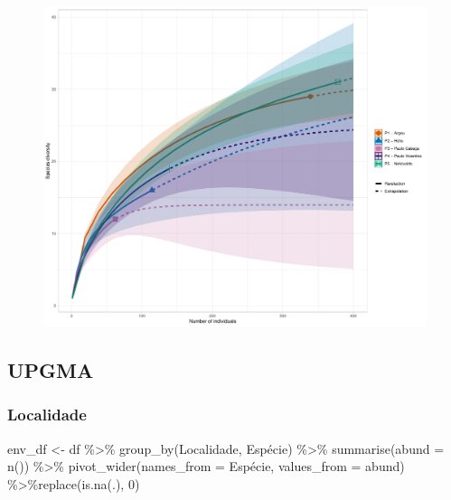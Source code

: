 \documentclass[
  letterpaper,
  DIV=11,
  numbers=noendperiod]{scrartcl}
\newenvironment{Shaded}{\begin{snugshade}}{\end{snugshade}}
\newcommand{\AttributeTok}[1]{\textcolor[rgb]{0.40,0.45,0.13}{#1}}
\newcommand{\DecValTok}[1]{\textcolor[rgb]{0.68,0.00,0.00}{#1}}
\newcommand{\FunctionTok}[1]{\textcolor[rgb]{0.28,0.35,0.67}{#1}}
\newcommand{\NormalTok}[1]{\textcolor[rgb]{0.00,0.23,0.31}{#1}}
\newcommand{\OtherTok}[1]{\textcolor[rgb]{0.00,0.23,0.31}{#1}}
\newcommand{\SpecialCharTok}[1]{\textcolor[rgb]{0.37,0.37,0.37}{#1}}
\begin{document}
\begin{figure}[H]

{\centering \includegraphics{report_nmds_files/figure-pdf/unnamed-chunk-15-1.pdf}

}

\end{figure}

\hypertarget{upgma}{%
\subsection{UPGMA}\label{upgma}}

\hypertarget{localidade}{%
\subsubsection{Localidade}\label{localidade}}

\begin{Shaded}
\begin{Highlighting}[]
\NormalTok{env\_df }\OtherTok{\textless{}{-}}\NormalTok{ df }\SpecialCharTok{\%\textgreater{}\%} 
  \FunctionTok{group\_by}\NormalTok{(Localidade, Espécie) }\SpecialCharTok{\%\textgreater{}\%}
  \FunctionTok{summarise}\NormalTok{(}\AttributeTok{abund =} \FunctionTok{n}\NormalTok{()) }\SpecialCharTok{\%\textgreater{}\%}
  \FunctionTok{pivot\_wider}\NormalTok{(}\AttributeTok{names\_from =}\NormalTok{ Espécie, }
              \AttributeTok{values\_from =}\NormalTok{ abund) }\SpecialCharTok{\%\textgreater{}\%}\FunctionTok{replace}\NormalTok{(}\FunctionTok{is.na}\NormalTok{(.), }\DecValTok{0}\NormalTok{)}
\end{Highlighting}
\end{Shaded}
\end{document}
